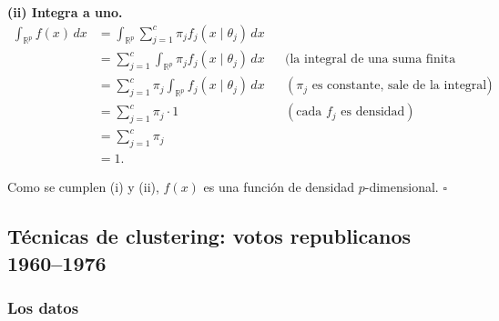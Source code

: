 \documentclass[11pt]{article}\usepackage[]{graphicx}\usepackage[]{xcolor}
\begin{document}
\textbf{(ii) Integra a uno.}
\begin{align*}
\int_{\mathbb{R}^p} f(x)\,dx
&= \int_{\mathbb{R}^p} \sum_{j=1}^c \pi_j f_j(x\mid\theta_j)\,dx\\
&= \sum_{j=1}^c \int_{\mathbb{R}^p} \pi_j f_j(x\mid\theta_j)\,dx
&& \text{(la integral de una suma finita es la suma de integrales)}\\
&= \sum_{j=1}^c \pi_j \int_{\mathbb{R}^p} f_j(x\mid\theta_j)\,dx
&& (\pi_j \text{ es constante, sale de la integral})\\
&= \sum_{j=1}^c \pi_j \cdot 1
&& (\text{cada } f_j \text{ es densidad})\\
&= \sum_{j=1}^c \pi_j\\
&= 1.
\end{align*}

Como se cumplen (i) y (ii), $f(x)$ es una función de densidad $p$-dimensional. \hfill$\square$

\subsection{Técnicas de clustering: votos republicanos 1960--1976}

\subsubsection*{Los datos}
\end{document}

